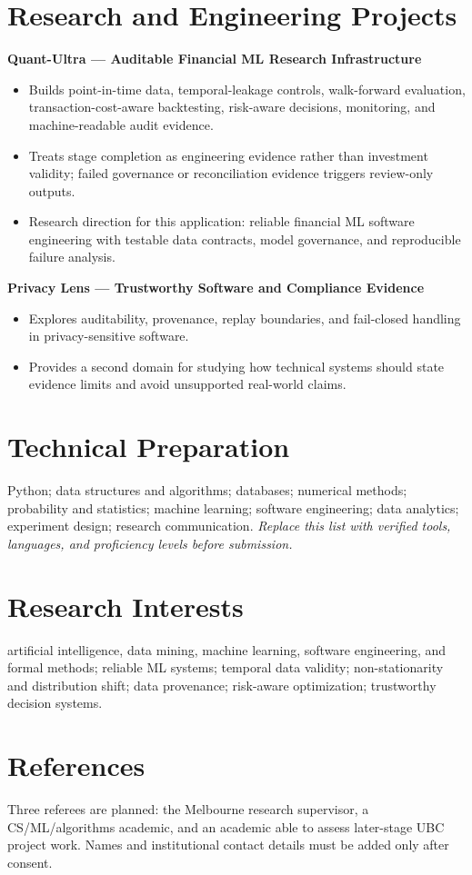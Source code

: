 \documentclass[11pt]{article}
\begin{document}
\section*{Research and Engineering Projects}
\textbf{Quant-Ultra --- Auditable Financial ML Research Infrastructure}
\begin{itemize}
\item Builds point-in-time data, temporal-leakage controls, walk-forward evaluation, transaction-cost-aware backtesting, risk-aware decisions, monitoring, and machine-readable audit evidence.
\item Treats stage completion as engineering evidence rather than investment validity; failed governance or reconciliation evidence triggers review-only outputs.
\item Research direction for this application: reliable financial ML software engineering with testable data contracts, model governance, and reproducible failure analysis.
\end{itemize}

\begin{samepage}
\textbf{Privacy Lens --- Trustworthy Software and Compliance Evidence}
\begin{itemize}
\item Explores auditability, provenance, replay boundaries, and fail-closed handling in privacy-sensitive software.
\item Provides a second domain for studying how technical systems should state evidence limits and avoid unsupported real-world claims.
\end{itemize}
\end{samepage}

\section*{Technical Preparation}
Python; data structures and algorithms; databases; numerical methods; probability and statistics; machine learning; software engineering; data analytics; experiment design; research communication. \textit{Replace this list with verified tools, languages, and proficiency levels before submission.}

\section*{Research Interests}
artificial intelligence, data mining, machine learning, software engineering, and formal methods; reliable ML systems; temporal data validity; non-stationarity and distribution shift; data provenance; risk-aware optimization; trustworthy decision systems.

\section*{References}
Three referees are planned: the Melbourne research supervisor, a CS/ML/algorithms academic, and an academic able to assess later-stage UBC project work. Names and institutional contact details must be added only after consent.
\end{document}
